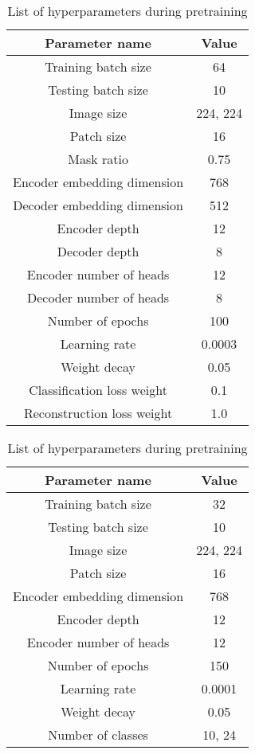 \begin{table}[h]
    \centering
    \caption{List of hyperparameters during pretraining}
    \begin{tabular}{|c|c|}
        \hline
        \textbf{Parameter name} & \textbf{Value} \\ \hline
        Training batch size & 64 \\ \hline
        Testing batch size & 10 \\ \hline
        Image size & 224, 224 \\ \hline
        Patch size & 16 \\ \hline
        Mask ratio & 0.75 \\ \hline
        Encoder embedding dimension & 768 \\ \hline
        Decoder embedding dimension & 512 \\ \hline
        Encoder depth & 12 \\ \hline
        Decoder depth & 8 \\ \hline
        Encoder number of heads & 12 \\ \hline
        Decoder number of heads & 8 \\ \hline
        Number of epochs & 100 \\ \hline
        Learning rate & 0.0003 \\ \hline
        Weight decay & 0.05 \\ \hline
        Classification loss weight & 0.1 \\ \hline
        Reconstruction loss weight & 1.0 \\ \hline
    \end{tabular}
    \label{tab:pre_para}
\end{table}

\begin{table}[h]
    \centering
    \caption{List of hyperparameters during pretraining}
    \begin{tabular}{|c|c|}
        \hline
        \textbf{Parameter name} & \textbf{Value} \\ \hline
        Training batch size & 32 \\ \hline
        Testing batch size & 10 \\ \hline
        Image size & 224, 224 \\ \hline
        Patch size & 16 \\ \hline
        Encoder embedding dimension & 768 \\ \hline
        Encoder depth & 12 \\ \hline
        Encoder number of heads & 12 \\ \hline
        Number of epochs & 150 \\ \hline
        Learning rate & 0.0001 \\ \hline
        Weight decay & 0.05 \\ \hline
        Number of classes & 10, 24 \\ \hline
    \end{tabular}
    \label{tab:fine_para}
\end{table}
